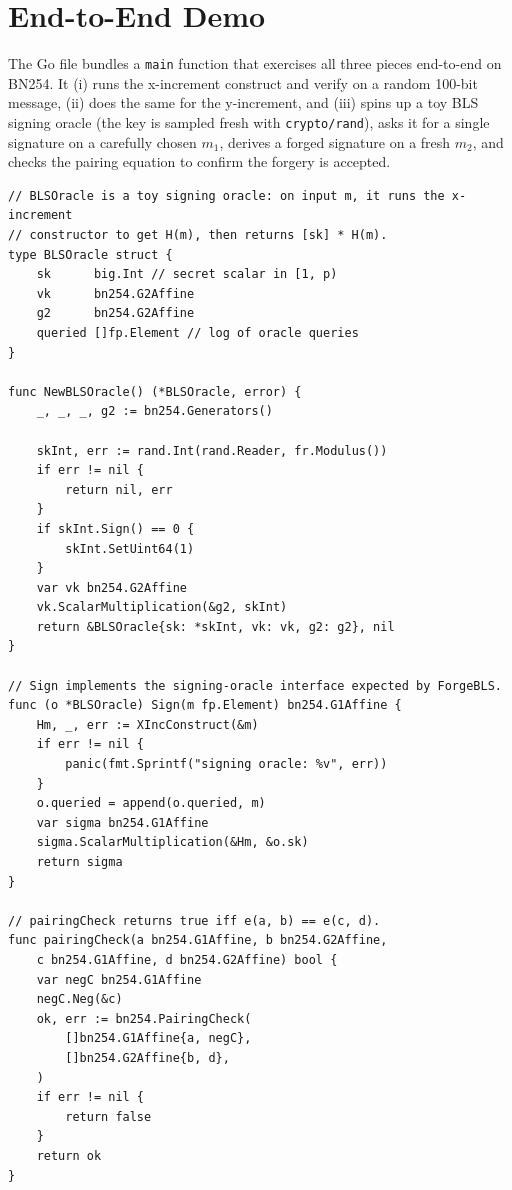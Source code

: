 \documentclass[11pt,a4paper]{article}
\theoremstyle{definition}
\begin{document}
\section{End-to-End Demo}
\label{sec:demo}

The Go file bundles a \texttt{main} function that exercises all three
pieces end-to-end on BN254. It (i) runs the x-increment construct and
verify on a random 100-bit message, (ii) does the same for the y-increment,
and (iii) spins up a toy BLS signing oracle (the key is sampled fresh with
\texttt{crypto/rand}), asks it for a single signature on a carefully
chosen $m_1$, derives a forged signature on a fresh $m_2$, and checks the
pairing equation to confirm the forgery is accepted.

\begin{lstlisting}[caption={Signing-oracle harness that wraps the
x-increment construction into a BLS signer / verifier.},
label={lst:oracle}]
// BLSOracle is a toy signing oracle: on input m, it runs the x-increment
// constructor to get H(m), then returns [sk] * H(m).
type BLSOracle struct {
    sk      big.Int // secret scalar in [1, p)
    vk      bn254.G2Affine
    g2      bn254.G2Affine
    queried []fp.Element // log of oracle queries
}

func NewBLSOracle() (*BLSOracle, error) {
    _, _, _, g2 := bn254.Generators()

    skInt, err := rand.Int(rand.Reader, fr.Modulus())
    if err != nil {
        return nil, err
    }
    if skInt.Sign() == 0 {
        skInt.SetUint64(1)
    }
    var vk bn254.G2Affine
    vk.ScalarMultiplication(&g2, skInt)
    return &BLSOracle{sk: *skInt, vk: vk, g2: g2}, nil
}

// Sign implements the signing-oracle interface expected by ForgeBLS.
func (o *BLSOracle) Sign(m fp.Element) bn254.G1Affine {
    Hm, _, err := XIncConstruct(&m)
    if err != nil {
        panic(fmt.Sprintf("signing oracle: %v", err))
    }
    o.queried = append(o.queried, m)
    var sigma bn254.G1Affine
    sigma.ScalarMultiplication(&Hm, &o.sk)
    return sigma
}

// pairingCheck returns true iff e(a, b) == e(c, d).
func pairingCheck(a bn254.G1Affine, b bn254.G2Affine,
    c bn254.G1Affine, d bn254.G2Affine) bool {
    var negC bn254.G1Affine
    negC.Neg(&c)
    ok, err := bn254.PairingCheck(
        []bn254.G1Affine{a, negC},
        []bn254.G2Affine{b, d},
    )
    if err != nil {
        return false
    }
    return ok
}
\end{lstlisting}
\end{document}

